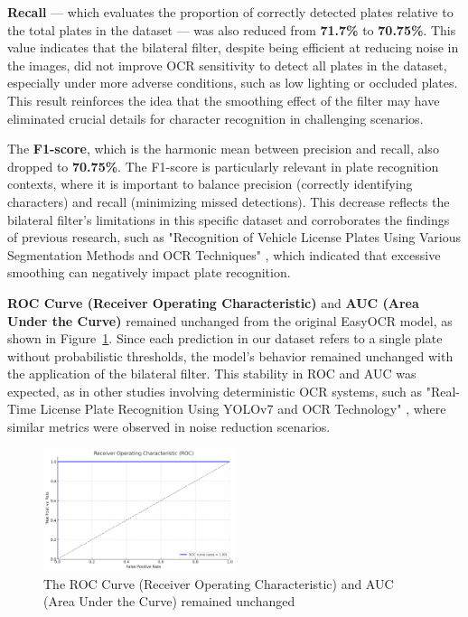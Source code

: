 \documentclass[conference]{IEEEtran}
\begin{document}
    \textbf{Recall} — which evaluates the proportion of correctly detected plates relative to the total plates in the dataset — was also reduced from \textbf{71.7\%} to \textbf{70.75\%}. This value indicates that the bilateral filter, despite being efficient at reducing noise in the images, did not improve OCR sensitivity to detect all plates in the dataset, especially under more adverse conditions, such as low lighting or occluded plates. This result reinforces the idea that the smoothing effect of the filter may have eliminated crucial details for character recognition in challenging scenarios.
    
    The \textbf{F1-score}, which is the harmonic mean between precision and recall, also dropped to \textbf{70.75\%}. The F1-score is particularly relevant in plate recognition contexts, where it is important to balance precision (correctly identifying characters) and recall (minimizing missed detections). This decrease reflects the bilateral filter's limitations in this specific dataset and corroborates the findings of previous research, such as "Recognition of Vehicle License Plates Using Various Segmentation Methods and OCR Techniques" \cite{b15}, which indicated that excessive smoothing can negatively impact plate recognition.
    
    \textbf{ROC Curve (Receiver Operating Characteristic)} and \textbf{AUC (Area Under the Curve)} remained unchanged from the original EasyOCR model, as shown in Figure~\ref{img13}. Since each prediction in our dataset refers to a single plate without probabilistic thresholds, the model's behavior remained unchanged with the application of the bilateral filter. This stability in ROC and AUC was expected, as in other studies involving deterministic OCR systems, such as "Real-Time License Plate Recognition Using YOLOv7 and OCR Technology" \cite{b17}, where similar metrics were observed in noise reduction scenarios.
    
    \begin{figure}[htbp]
        \centerline{\includegraphics[width=0.5\textwidth]{img13.png}}
        \caption{The ROC Curve (Receiver Operating Characteristic) and AUC (Area Under the Curve) remained unchanged}
        \label{img13}
    \end{figure}
    
\end{document}
